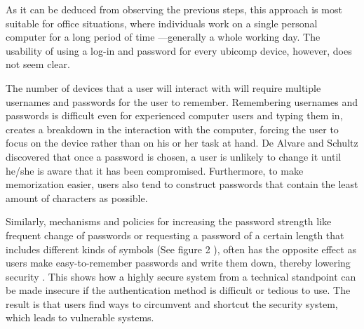 \documentclass{article}
\begin{document}
As it can be deduced from observing the previous steps, this approach is most suitable for office situations, where individuals work on a single personal computer for a long period of time ---generally a whole working day. The usability of using a log-in and password for every ubicomp device, however, does not seem clear. 

The number of devices that a user will interact with will require multiple usernames and passwords for the user to remember. Remembering usernames and passwords is difficult even for experienced computer users and typing them in, creates a breakdown in the interaction with the computer, forcing the user to focus on the device rather than on his or her task at hand.  De Alvare and Schultz\cite{dealvare1988framework} discovered that once a password is chosen, a user is unlikely to change it until he/she is aware that it has been compromised. Furthermore, to make memorization easier, users also tend to construct passwords that contain the least amount of characters as possible.

Similarly, mechanisms and policies for increasing the password strength like frequent change of passwords or requesting a password of a certain length that includes different kinds of symbols (See figure 2 ), often has the opposite effect as users make easy-to-remember passwords and write them down, thereby lowering security \cite{adams1999users}. This shows how a highly secure system from a technical standpoint can be made insecure if the authentication method is difficult or tedious to use. The result is that users find ways to circumvent and shortcut the security system, which leads to vulnerable systems. 
\end{document}
